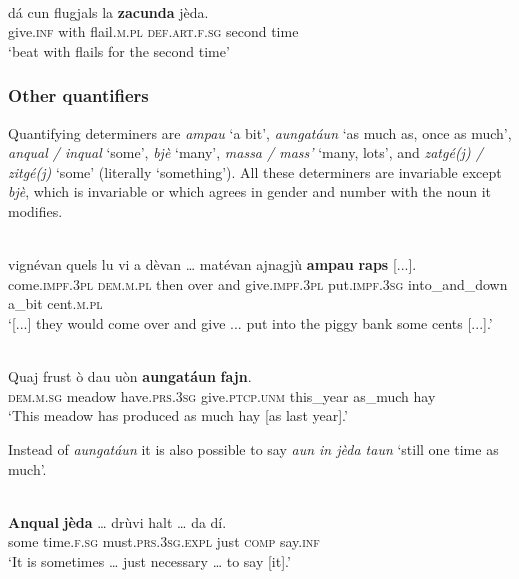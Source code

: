 \ea
{}\\
\gll  dá cun flugjals la \textbf{zacunda} jèda.\\
    give.\textsc{inf} with flail.\textsc{m.pl} \textsc{def.art.f.sg} second time \\
\glt `beat with flails for the second time'
\z

\subsubsection{Other quantifiers}
Quantifying determiners are \textit{ampau} `a bit', \textit{aungatáun} `as much as, once as much', \textit{anqual / inqual} `some', \textit{bjè} `many', \textit{massa / mass'} `many, lots', and \textit{zatgé(j) / zitgé(j)} `some' (literally `something'). All these determiners are invariable except \textit{bjè}, which is invariable or which agrees in gender and number with the noun it modifies.


\ea
{}\\
\gll    [...] vignévan quels lu vi a dèvan … matévan ajnagjù \textbf{ampau} \textbf{raps} [...].\\
 {} come.\textsc{impf.3pl} \textsc{dem.m.pl} then over and give.\textsc{impf.3pl} {} put.\textsc{impf.3sg} into\_and\_down a\_bit cent.\textsc{m.pl}\\
\glt `[...] they would come over and give ... put into the piggy bank some cents [...].'
\z

\ea
{}\\
\gll  Quaj frust ò dau uòn \textbf{aungatáun} \textbf{fajn}. \\
\textsc{dem.m.sg} meadow have.\textsc{prs.3sg} give.\textsc{ptcp.unm} this\_year as\_much hay \\
\glt `This meadow has produced as much hay [as last year].'
\z

Instead of \textit{aungatáun} it is also possible to say \textit{aun in jèda taun} `still one time as much'.

\ea

\\
\gll  \textbf{Anqual} \textbf{jèda} … drùvi halt … da dí.\\
some time.\textsc{f.sg} {} must.\textsc{prs.3sg.expl} just {} \textsc{comp} say.\textsc{inf}\\
\glt `It is sometimes … just necessary … to say [it].'
\z

